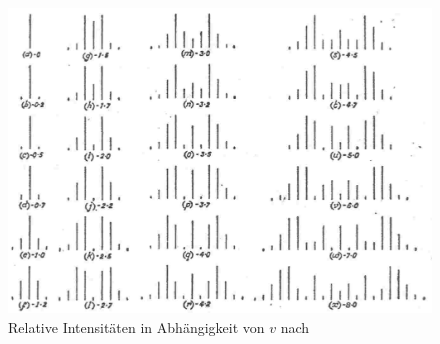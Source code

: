 \begin{figure}[H]
 \centering \includegraphics{Bilder/bessel-funktionen.jpg}
 \caption{Relative Intensitäten in Abhängigkeit von $v$ nach \cite{Raman}}
\end{figure}

